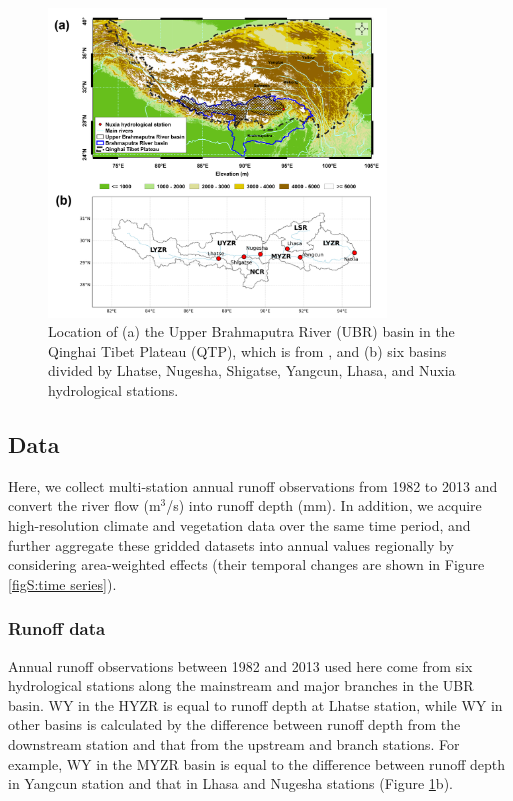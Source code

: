\documentclass[hess, manuscript]{copernicus}
\begin{document}
\begin{figure}[ht]
    \includegraphics[width=0.8\textwidth]{02-figures/Figure1.png}
    \caption{Location of (a) the Upper Brahmaputra River (UBR) basin in the Qinghai Tibet Plateau (QTP), which is from \citet{li2021vegetation}, and (b) six basins divided by Lhatse, Nugesha, Shigatse, Yangcun, Lhasa, and Nuxia hydrological stations.}
    \label{fig:location}
\end{figure}

\subsection{Data}
Here, we collect multi-station annual runoff observations from 1982 to 2013 and convert the river flow (m$^{3}$/s) into runoff depth (mm). In addition, we acquire high-resolution climate and vegetation data over the same time period, and further aggregate these gridded datasets into annual values regionally by considering area-weighted effects (their temporal changes are shown in Figure \ref{figS:time series}).

\subsubsection{Runoff data}
Annual runoff observations between 1982 and 2013 used here come from six hydrological stations along the mainstream and major branches in the UBR basin. WY in the HYZR is equal to runoff depth at Lhatse station, while WY in other basins is calculated by the difference between runoff depth from the downstream station and that from the upstream and branch stations. For example, WY in the MYZR basin is equal to the difference between runoff depth in Yangcun station and that in Lhasa and Nugesha stations (Figure \ref{fig:location}b).
\end{document}
